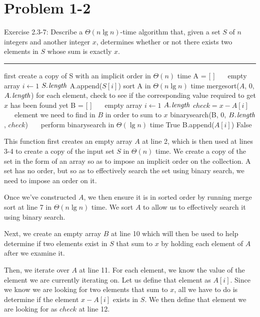 \documentclass[11pt]{article}
\def\separateline{\medskip\hrule\medskip}
\begin{document}
\newpage

\section{Problem 1-2}
Exercise 2.3-7: Describe a $\Theta(n\lg{n})$-time algorithm that, given a set $S$ of $n$ integers and another integer $x$, determines whether or not there exists two elements in $S$ whose sum is exactly $x$.
\separateline
\begin{codebox}
\li \Comment first create a copy of S with an implicit order in $\Theta(n)$ time
\li A = [ ]      ~~~\Comment empty array
\li \For $i \gets 1$ \To $\attrib{S}{length}$
\li     \Do A.append($S[i]$)
\li  \End
\li \Comment sort A in $\Theta(n\lg{n})$ time
\li mergesort($A$, $0$, $\attrib{A}{length}$)
\li
\li \Comment for each element, check to see if the corresponding value required to get $x$ has been found yet
\li B = [ ]       ~~~\Comment empty array
\li \For $i \gets 1$ \To $\attrib{A}{length}$
        \Do
\li     $check = x - A[i]$  ~~~\Comment element we need to find in $B$ in order to sum to $x$
\li     \If binarysearch(B, 0, $\attrib{B}{length}$, $check$)    ~~~\Comment perform binarysearch in $\Theta(\lg{n})$ time
\li         \Then
                \Return True
        \End
\li     B.append($A[i]$)
\li \End
\li \Return False
\end{codebox}

\hspace*{6mm}

This function first creates an empty array $A$ at line 2, which is then used at lines 3-4 to create a copy of the input set $S$ in $\Theta(n)$ time. We create a copy of the set in the form of an array so as to impose an implicit order on the collection. A set has no order, but so as to effectively search the set using binary search, we need to impose an order on it.

Once we've constructed $A$, we then ensure it is in sorted order by running merge sort at line 7 in $\Theta(n\lg{n})$ time. We sort $A$ to allow us to effectively search it using binary search.

Next, we create an empty array $B$ at line 10 which will then be used to help determine if two elements exist in $S$ that sum to $x$ by holding each element of $A$ after we examine it.

Then, we iterate over $A$ at line 11. For each element, we know the value of the element we are currently iterating on. Let us define that element as $A[i]$. Since we know we are looking for two elements that sum to $x$, all we have to do is determine if the element $x - A[i]$ exists in $S$. We then define that element we are looking for as $check$ at line 12.
\end{document}
